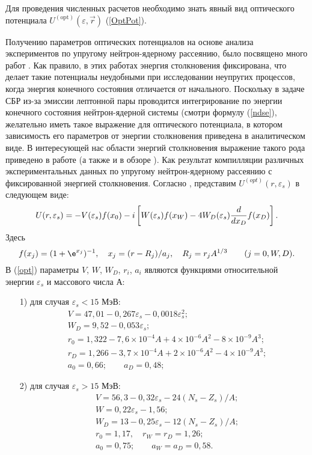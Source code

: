 Для проведения численных расчетов необходимо знать явный вид оптического
потенциала $U^{(\mathrm{opt})}(\varepsilon,\vec r)$ (\ref{OptPot}).


Получению
параметров оптических потенциалов  на основе анализа экспериментов по
упругому нейтрон-ядерному рассеянию, было посвящено много работ \cite{PhR1969, PhR1971, PhR1981, NPh1964, PhR1987}.
Как правило, в этих работах энергия столкновения фиксирована, что делает такие
потенциалы неудобными при исследовании неупругих процессов,
когда энергия конечного состояния отличается от начального.
Поскольку в задаче СБР из-за эмиссии  лептонной пары проводится
интегрирование по энергии конечного состояния нейтрон-ядерной системы (смотри
формулу (\ref{ndse}), желательно иметь такое выражение для
оптического потенциала, в котором зависимость его параметров от энергии
столкновения приведена в аналитическом виде. В интересующей нас области
энергий столкновения выражение такого рода приведено в работе \cite{perey}
(а также и в обзоре \cite{bechetti}). Как результат компилляции различных
экспериментальных данных по упругому нейтрон-ядерному рассеянию
с фиксированной энергией столкновения.
Согласно \cite{perey}, представим $U^{(opt)}(r,\varepsilon_s)$ в следующем виде:
\begin{eqnarray}\label{opt}
U(r,\varepsilon_s)=-V(\varepsilon_s)f(x_0)-i\left[W(\varepsilon_s)f(x_W)-
4W_D(\varepsilon_s){{d}\over{dx_D}}f(x_D)\right].
\end{eqnarray}
Здесь
\begin{equation}\label{param}
f(x_j)=(1+\e^{x_j})^{-1}, \quad x_j=(r-R_j)/a_j, \quad R_j=r_j A^{1/3} \qquad (j=0,W,D).
\end{equation}
В (\ref{opt})
параметры $V$, $W$, $W_D$, $r_i$, $a_i$
являются функциями относительной энергии $\varepsilon_s$ и массового числа А:
\begin{itemize}
\item[1)] для случая $\varepsilon_s<15$ МэВ:
\begin{equation}\label{1param}
\begin{split}
& V=47,01-0,267\varepsilon_s -0,0018\varepsilon_s^2;\\
&W_D=9,52-0,053\varepsilon_s;\\
&r_0=1,322-7,6\times 10^{-4}A+4\times 10^{-6}A^2-8\times 10^{-9}A^3;\\
&r_D=1,266-3,7\times 10^{-4}A+2\times 10^{-6}A^2-4\times 10^{-9}A^3;\\
&a_0=0,66; \qquad a_D=0,48;
\end{split}
\end{equation}

\item[2)] для случая $\varepsilon_s>15$ МэВ:
\begin{equation}\label{2param}
\begin{split}
&V=56,3-0,32\varepsilon_s -24(N_s-Z_s)/A;\\
&W=0,22\varepsilon_s-1,56;\\
&W_D=13-0,25\varepsilon_s -12(N_s-Z_s)/A;\\
&r_0=1,17, \quad r_W=r_D=1,26;\\
&a_0=0,75; \qquad a_W=a_D=0,58.
\end{split}
\end{equation}
\end{itemize}
